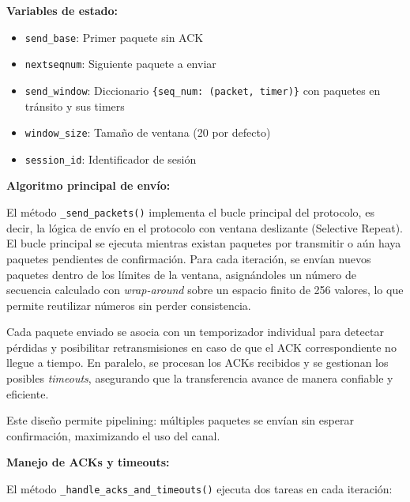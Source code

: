 \textbf{Variables de estado:}
\begin{itemize}
    \item \texttt{send\_base}: Primer paquete sin ACK
    \item \texttt{nextseqnum}: Siguiente paquete a enviar
    \item \texttt{send\_window}: Diccionario \texttt{\{seq\_num: (packet, timer)\}} con paquetes en tránsito y sus timers
    \item \texttt{window\_size}: Tamaño de ventana (20 por defecto)
    \item \texttt{session\_id}: Identificador de sesión
\end{itemize}

\textbf{Algoritmo principal de envío:}

El método \texttt{\_send\_packets()} implementa el bucle principal del protocolo, es decir, la lógica de envío en el protocolo con ventana deslizante (Selective Repeat).
\\

El bucle principal se ejecuta mientras existan paquetes por transmitir o aún haya paquetes pendientes de confirmación. Para cada iteración, se envían nuevos paquetes dentro de los límites de la ventana, asignándoles un número de secuencia calculado con \textit{wrap-around} sobre un espacio finito de 256 valores, lo que permite reutilizar números sin perder consistencia.

Cada paquete enviado se asocia con un temporizador individual para detectar pérdidas y posibilitar retransmisiones en caso de que el ACK correspondiente no llegue a tiempo. En paralelo, se procesan los ACKs recibidos y se gestionan los posibles \textit{timeouts}, asegurando que la transferencia avance de manera confiable y eficiente.

Este diseño permite pipelining: múltiples paquetes se envían sin esperar confirmación, maximizando el uso del canal.

\textbf{Manejo de ACKs y timeouts:}

El método \texttt{\_handle\_acks\_and\_timeouts()} ejecuta dos tareas en cada iteración:

